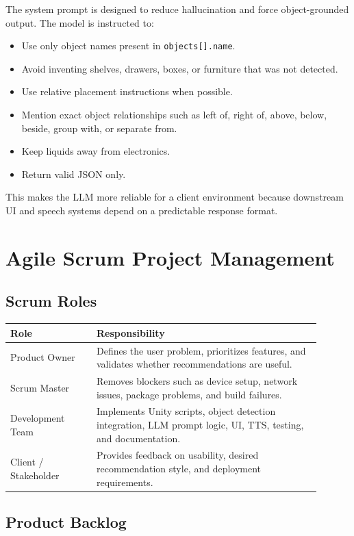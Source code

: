 \documentclass[12pt,a4paper]{article}
\begin{document}
The system prompt is designed to reduce hallucination and force object-grounded output. The model is instructed to:

\begin{itemize}
    \item Use only object names present in \texttt{objects[].name}.
    \item Avoid inventing shelves, drawers, boxes, or furniture that was not detected.
    \item Use relative placement instructions when possible.
    \item Mention exact object relationships such as left of, right of, above, below, beside, group with, or separate from.
    \item Keep liquids away from electronics.
    \item Return valid JSON only.
\end{itemize}

This makes the LLM more reliable for a client environment because downstream UI and speech systems depend on a predictable response format.

\section{Agile Scrum Project Management}

\subsection{Scrum Roles}

\begin{longtable}{p{0.25\linewidth} p{0.65\linewidth}}
\toprule
\textbf{Role} & \textbf{Responsibility}\\
\midrule
Product Owner & Defines the user problem, prioritizes features, and validates whether recommendations are useful.\\
Scrum Master & Removes blockers such as device setup, network issues, package problems, and build failures.\\
Development Team & Implements Unity scripts, object detection integration, LLM prompt logic, UI, TTS, testing, and documentation.\\
Client / Stakeholder & Provides feedback on usability, desired recommendation style, and deployment requirements.\\
\bottomrule
\end{longtable}

\subsection{Product Backlog}
\end{document}
